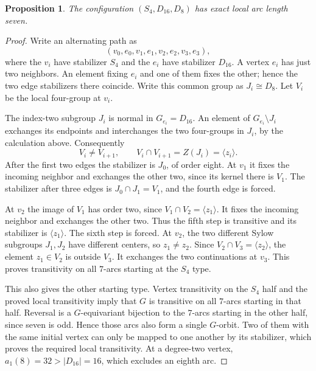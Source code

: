\documentclass[11pt]{article}
\newtheorem{proposition}[lemma]{Proposition}
\begin{document}
\begin{proposition}\label{d16}
The configuration $(S_4,D_{16},D_8)$ has exact local arc length seven.
\end{proposition}
\begin{proof}
Write an alternating path as
\[
 (v_0,e_0,v_1,e_1,v_2,e_2,v_3,e_3),
\]
where the $v_i$ have stabilizer $S_4$ and the $e_i$ have stabilizer
$D_{16}$. A vertex $e_i$ has just two neighbors. An element fixing
$e_i$ and one of them fixes the other; hence the two edge stabilizers
there coincide. Write this common group as $J_i\cong D_8$.
Let $V_i$ be the local four-group at $v_i$.

The index-two subgroup $J_i$ is normal in $G_{e_i}=D_{16}$.
An element of $G_{e_i}\setminus J_i$ exchanges its endpoints and
interchanges the two four-groups in $J_i$, by the calculation above.
Consequently
\[
 V_i\ne V_{i+1},\qquad
 V_i\cap V_{i+1}=Z(J_i)=\langle z_i\rangle.
\]
After the first two edges the stabilizer is $J_0$, of order eight.
At $v_1$ it fixes the incoming neighbor and exchanges the other two,
since its kernel there is $V_1$. The stabilizer after three edges is
$J_0\cap J_1=V_1$, and the fourth edge is forced.

At $v_2$ the image of $V_1$ has order two, since
$V_1\cap V_2=\langle z_1\rangle$. It fixes the incoming neighbor
and exchanges the other two. Thus the fifth step is transitive and
its stabilizer is $\langle z_1\rangle$. The sixth step is forced.
At $v_2$, the two different Sylow subgroups $J_1,J_2$ have different
centers, so $z_1\ne z_2$. Since
$V_2\cap V_3=\langle z_2\rangle$, the element $z_1\in V_2$ is
outside $V_3$. It exchanges the two continuations at $v_3$. This
proves transitivity on all $7$-arcs starting at the $S_4$ type.

This also gives the other starting type. Vertex transitivity on the
$S_4$ half and the proved local transitivity imply that $G$ is transitive
on all $7$-arcs starting in that half. Reversal is a $G$-equivariant
bijection to the $7$-arcs starting in the other half, since seven is odd.
Hence those arcs also form a single $G$-orbit. Two of them with the same
initial vertex can only be mapped to one another by its stabilizer,
which proves the required local transitivity.
At a degree-two vertex, $a_1(8)=32>|D_{16}|=16$, which excludes
an eighth arc.
\end{proof}
\end{document}
